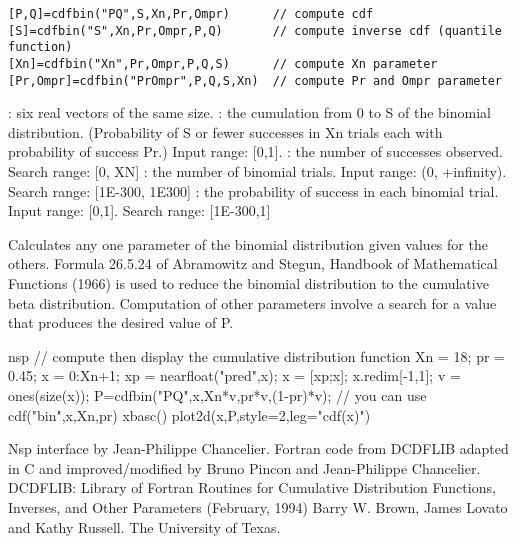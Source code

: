 \begin{mandesc}
\end{mandesc}
\label{cdfbin}
\begin{calling_sequence}
\begin{verbatim}
[P,Q]=cdfbin("PQ",S,Xn,Pr,Ompr)      // compute cdf
[S]=cdfbin("S",Xn,Pr,Ompr,P,Q)       // compute inverse cdf (quantile function)
[Xn]=cdfbin("Xn",Pr,Ompr,P,Q,S)      // compute Xn parameter
[Pr,Ompr]=cdfbin("PrOmpr",P,Q,S,Xn)  // compute Pr and Ompr parameter
\end{verbatim}
\end{calling_sequence}
\begin{parameters}
  \begin{varlist}
    : six real vectors of the same size.
    : the cumulation from 0 to S of the binomial distribution. (Probability of S or fewer successes in Xn trials each with probability of success Pr.) Input range: [0,1].
    : the number of successes observed. Search range: [0, XN]
    : the number of binomial trials. Input range: (0, +infinity). Search range: [1E-300, 1E300]
    : the probability of success in each binomial trial. Input range: [0,1]. Search range: [1E-300,1]
  \end{varlist}
\end{parameters}

\begin{mandescription}
  Calculates any one parameter of the binomial distribution given values 
  for the others. Formula  26.5.24 of  Abramowitz and Stegun,  Handbook   of
  Mathematical   Functions (1966) is used  to reduce the  binomial
  distribution  to  the  cumulative beta distribution.
  Computation of other parameters involve a search for a value that
  produces  the desired  value  of P.
\end{mandescription}

\begin{examples}
\begin{mintednsp}{nsp}
// compute then display the cumulative distribution function
Xn = 18; pr = 0.45;
x = 0:Xn+1; xp = nearfloat("pred",x);
x = [xp;x]; x.redim[-1,1]; 
v = ones(size(x));
P=cdfbin("PQ",x,Xn*v,pr*v,(1-pr)*v); // you can use cdf("bin",x,Xn,pr)
xbasc()
plot2d(x,P,style=2,leg="cdf(x)")
\end{mintednsp}
\end{examples}

\begin{authors}
  Nsp interface by Jean-Philippe Chancelier. Fortran code from DCDFLIB
  adapted in C and improved/modified by Bruno Pincon and Jean-Philippe Chancelier.  
  DCDFLIB: Library of Fortran Routines for Cumulative Distribution
  Functions, Inverses, and Other Parameters (February, 1994)
  Barry W. Brown, James Lovato and Kathy Russell. The University of Texas.
\end{authors}


